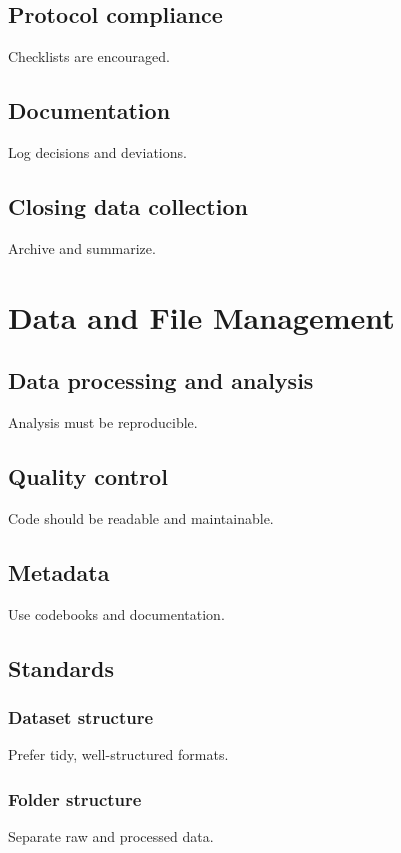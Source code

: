 \documentclass[11pt]{article}
\begin{document}
\subsection{Protocol compliance}
Checklists are encouraged.

\subsection{Documentation}
Log decisions and deviations.

\subsection{Closing data collection}
Archive and summarize.

\section{Data and File Management}

\subsection{Data processing and analysis}
Analysis must be reproducible.

\subsection{Quality control}
Code should be readable and maintainable.

\subsection{Metadata}
Use codebooks and documentation.

\subsection{Standards}

\subsubsection{Dataset structure}
Prefer tidy, well-structured formats.

\subsubsection{Folder structure}
Separate raw and processed data.
\end{document}
